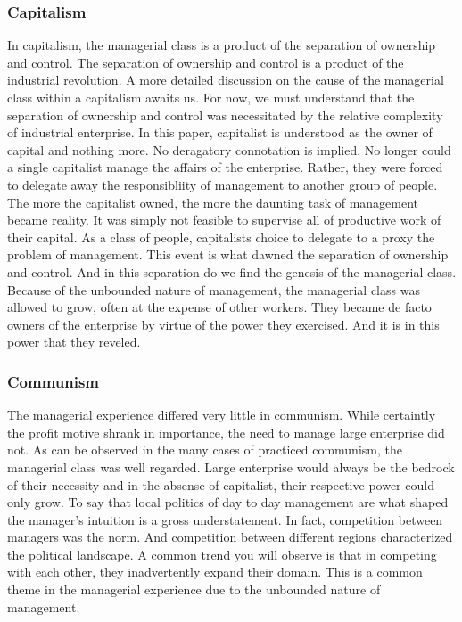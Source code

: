 \documentclass[12pt]{article}
\begin{document}
\subsubsection{Capitalism}
In capitalism, the managerial class is a product of the separation of ownership and control.
The separation of ownership and control is a product of the industrial revolution.
A more detailed discussion on the cause of the managerial class within a capitalism awaits us.
For now, we must understand that the separation of ownership and control was necessitated by the relative complexity of industrial enterprise.
In this paper, capitalist is understood as the owner of capital and nothing more.
No deragatory connotation is implied.
No longer could a single capitalist manage the affairs of the enterprise.
Rather, they were forced to delegate away the responsibliity of management to another group of people.
The more the capitalist owned, the more the daunting task of management became reality.
It was simply not feasible to supervise all of productive work of their capital.
As a class of people, capitalists choice to delegate to a proxy the problem of management.
This event is what dawned the separation of ownership and control.
And in this separation do we find the genesis of the managerial class.
Because of the unbounded nature of management, the managerial class was allowed to grow, often at the expense of other workers.
They became de facto owners of the enterprise by virtue of the power they exercised.
And it is in this power that they reveled.

\subsubsection{Communism}
The managerial experience differed very little in communism.
While certaintly the profit motive shrank in importance, the need to manage large enterprise did not.
As can be observed in the many cases of practiced communism, the managerial class was well regarded.
Large enterprise would always be the bedrock of their necessity and in the absense of capitalist, their respective power could only grow.
To say that local politics of day to day management are what shaped the manager's intuition is a gross understatement.
In fact, competition between managers was the norm.
And competition between different regions characterized the political landscape.
A common trend you will observe is that in competing with each other, they inadvertently expand their domain.
This is a common theme in the managerial experience due to the unbounded nature of management.
\end{document}
